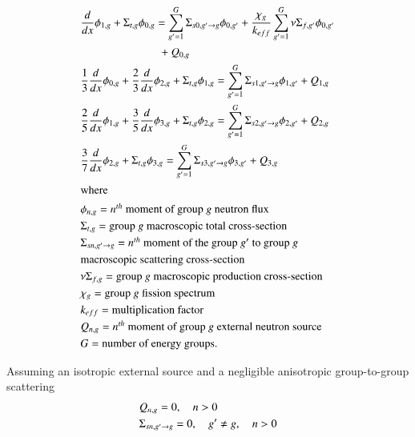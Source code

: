 \documentclass{anstrans}
\begin{document}
\begin{align}
    & \frac{d}{dx} \phi_{1,g} + \Sigma_{t,g} \phi_{0,g} = \sum_{g'=1}^G \Sigma_{s0,g' \rightarrow g} \phi_{0,g'} + \frac{\chi_g}{k_{eff}} \sum_{g'=1}^G \nu\Sigma_{f,g'} \phi_{0,g'} \notag \\ & \quad \quad \quad \quad \quad \quad \quad + Q_{0,g}  \label{eq:P3-0} \\
    & \frac{1}{3} \frac{d}{dx} \phi_{0,g} + \frac{2}{3}\frac{d}{dx}\phi_{2,g} + \Sigma_{t,g} \phi_{1,g} = \sum_{g'=1}^G \Sigma_{s1,g' \rightarrow g} \phi_{1,g'} + Q_{1,g} \label{eq:P3-1} \\
    & \frac{2}{5} \frac{d}{dx}\phi_{1,g} + \frac{3}{5}\frac{d}{dx}\phi_{3,g} + \Sigma_{t,g} \phi_{2,g} = \sum_{g'=1}^G \Sigma_{s2,g' \rightarrow g} \phi_{2,g'} + Q_{2,g} \label{eq:P3-2} \\
    & \frac{3}{7}\frac{d}{dx}\phi_{2,g} + \Sigma_{t,g} \phi_{3,g} = \sum_{g'=1}^G \Sigma_{s3,g' \rightarrow g} \phi_{3,g'} + Q_{3,g} \label{eq:P3-3} \\
    \intertext{where}
    & \phi_{n,g} = \mbox{$n^{th}$ moment of group $g$ neutron flux}  \notag \\ %
    & \Sigma_{t,g} = \mbox{group $g$ macroscopic total cross-section}  \notag \\ %
	& \Sigma_{sn,g' \rightarrow g} = \mbox{$n^{th}$ moment of the group $g'$ to group $g$} \notag \\
	& \mbox{macroscopic scattering cross-section}  \notag \\ %
	& \nu\Sigma_{f,g} = \mbox{group $g$ macroscopic production cross-section}  \notag \\ %
	& \chi_{g} = \mbox{group $g$ fission spectrum}  \notag \\ %
	& k_{eff} = \mbox{multiplication factor}  \notag \\ %
	& Q_{n,g} = \mbox{$n^{th}$ moment of group $g$ external neutron source}  \notag \\  %
	& G = \mbox{number of energy groups}.  \notag %
\end{align}

Assuming an isotropic external source and a negligible anisotropic group-to-group scattering \cite{brantley_simplifiedP3_2000}
\begin{align}
	& Q_{n,g} = 0, \quad n > 0 \notag \\
	& \Sigma_{sn,g' \rightarrow g} = 0, \quad g' \ne g, \quad n > 0 \notag
\end{align}
\end{document}
